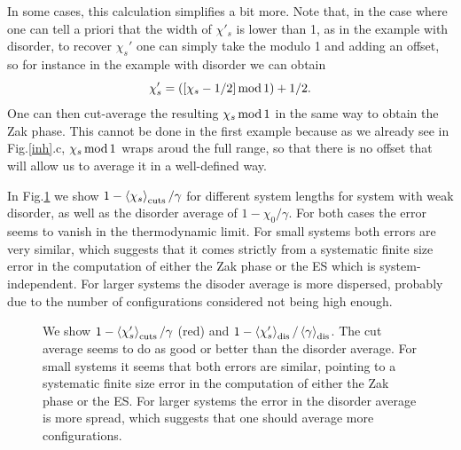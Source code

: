 \documentclass[twocolumn,amsmath,longbibliography,amssymb,superscriptaddress]{revtex4-1}
\begin{document}
In some cases, this calculation simplifies a bit more. Note that, in the case where one can tell a priori that the width of $\chi'_s$ is lower than 1, as in the example with disorder, to recover $\chi_s'$ one can simply take the modulo 1 and adding an offset, so for instance in the example with disorder we can obtain
\begin{equation}
\chi'_s = ([\chi_s-1/2] \, {\rm mod} \, 1)+1/2.
\end{equation}
One can then cut-average the resulting $\chi_s \, \rm{mod} \,1$ in the same way to obtain the Zak phase. This cannot be done in the first example because as we already see in Fig.\ref{inh}.c, $\chi_s \, \rm{mod} \,1$ wraps aroud the full range, so that there is no offset that will allow us to average it in a well-defined way.


In Fig.\ref{disorder} we show $1-\expval{\chi_s}_{\rm cuts}/\gamma$ for different system lengths for system with weak disorder, as well as the disorder average of $1-\chi_0/\gamma$. For both cases the error seems to vanish in the thermodynamic limit. For small systems both errors are very similar, which suggests that it comes strictly from a systematic finite size error in the computation of either the Zak phase or the ES which is system-independent. For larger systems the disoder average is more dispersed, probably due to the number of configurations considered not being high enough. 

\begin{figure}[h]
\centering
{}
\caption{We show $1-\expval{\chi_s'}_{\rm cuts}/\gamma$ (red) and $1-\expval{\chi_s'}_{\rm dis}/\expval{\gamma}_{\rm dis}$. The cut average seems to do as good or better than the disorder average. For small systems it seems that both errors are similar, pointing to a systematic finite size error in the computation of either the Zak phase or the ES. For larger systems the error in the disorder average is more spread, which suggests that one should average more configurations.}
\label{disorder}
\end{figure}
\end{document}
